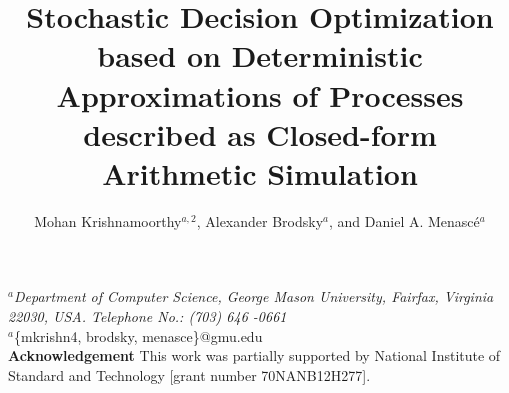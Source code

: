 \documentclass[a4paper, 12pt]{article} %
\title{\textbf{Stochastic Decision Optimization based on Deterministic Approximations of Processes described as Closed-form Arithmetic Simulation }} %
\author{Mohan Krishnamoorthy$^{a,2}$, Alexander Brodsky$^a$, and Daniel A. Menasc\'e$^{a}$} %
\makeatletter
\renewcommand{\maketitle}{ %
\begin{flushleft} 
{\large\@title\footnotemark[1]} %

\vspace{20pt} %

{\large\@author} %
\end{flushleft}
}
\makeatother
\begin{document}
\pagestyle{empty}
\maketitle %

\begin{flushleft} 
\vspace{10pt}
$^a$\textit{Department of Computer Science, George Mason University, Fairfax, Virginia 22030, USA. Telephone No.: (703) 646 -0661
}\\
\vspace{20pt}
$^a$\{mkrishn4, brodsky, menasce\}@gmu.edu \\
\vspace{20pt}
\textbf{Acknowledgement}\newline
This work was partially supported by National Institute of Standard and Technology [grant number 70NANB12H277]. \newline
\vspace{20pt}

\end{flushleft} 

\newpage
\noindent{\large \@title }
\vspace{10pt}
\end{document}
